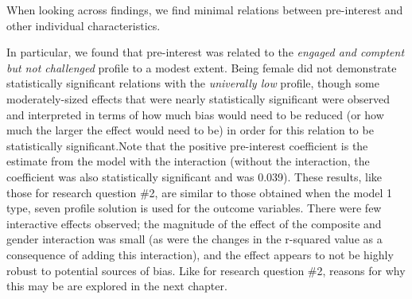 \documentclass[]{book}
\theoremstyle{definition}
\theoremstyle{definition}
\theoremstyle{definition}
\theoremstyle{remark}
\begin{document}
When looking across findings, we find minimal relations between
pre-interest and other individual characteristics.

\begin{landscape}\begin{table}

\caption{\label{tab:unnamed-chunk-16}Summary of results for research question 4}
\centering
{}
\end{table}
\end{landscape}

In particular, we found that pre-interest was related to the
\emph{engaged and comptent but not challenged} profile to a modest
extent. Being female did not demonstrate statistically significant
relations with the \emph{univerally low} profile, though some
moderately-sized effects that were nearly statistically significant were
observed and interpreted in terms of how much bias would need to be
reduced (or how much the larger the effect would need to be) in order
for this relation to be statistically significant.Note that the positive
pre-interest coefficient is the estimate from the model with the
interaction (without the interaction, the coefficient was also
statistically significant and was 0.039). These results, like those for
research question \#2, are similar to those obtained when the model 1
type, seven profile solution is used for the outcome variables. There
were few interactive effects observed; the magnitude of the effect of
the composite and gender interaction was small (as were the changes in
the r-squared value as a consequence of adding this interaction), and
the effect appears to not be highly robust to potential sources of bias.
Like for research question \#2, reasons for why this may be are explored
in the next chapter.
\end{document}
